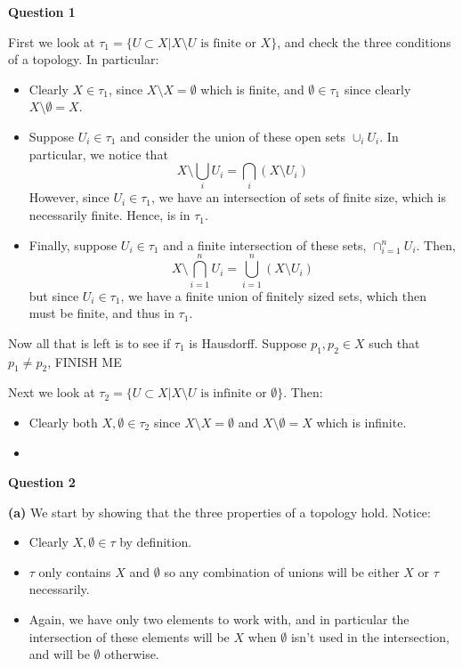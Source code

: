 \documentclass[10pt]{article}
\begin{document}
\textbf{Question 1}

First we look at $\tau_{1} = \{U\subset X | X \setminus U \text{ is finite or } X\}$, and check the three conditions of a topology. In particular:
\begin{itemize}
\item Clearly $X \in \tau_{1}$, since $X \setminus X = \emptyset$ which is finite, and $\emptyset \in \tau_{1}$ since clearly $X \setminus \emptyset = X$.
\item Suppose $U_{i}\in \tau_{1}$ and consider the union of these open sets $\cup_{i}U_{i}$. In particular, we notice that
  $$X \setminus \bigcup_{i}U_{i} = \bigcap_{i}\left(X\setminus U_{i}\right)$$
  However, since $U_{i}\in \tau_{1}$, we have an intersection of sets of finite size, which is necessarily finite. Hence, is in $\tau_{1}$.
\item Finally, suppose $U_{i}\in \tau_{1}$ and a finite intersection of these sets, $\cap_{i=1}^{n}U_{i}$. Then,
  $$X\setminus \bigcap_{i=1}^{n}U_{i} = \bigcup_{i=1}^{n}\left(X\setminus U_{i}\right)$$
  but since $U_{i}\in \tau_{1}$, we have a finite union of finitely sized sets, which then must be finite, and thus in $\tau_{1}$.
\end{itemize}
Now all that is left is to see if $\tau_{1}$ is Hausdorff. Suppose $p_{1},p_{2}\in X$ such that $p_{1} \neq p_{2}$, FINISH ME

Next we look at $\tau_{2} = \{ U \subset X | X\setminus U \text{ is infinite or } \emptyset \}$. Then:
\begin{itemize}
\item Clearly both $X,\emptyset \in \tau_{2}$ since $X\setminus X = \emptyset$ and $X \setminus \emptyset = X$ which is infinite.
\item  
\end{itemize}

\newpage

\textbf{Question 2}

\textbf{(a)} We start by showing that the three properties of a topology hold. Notice:
\begin{itemize}
\item Clearly $X,\emptyset \in \tau$ by definition.
\item $\tau$ only contains $X$ and $\emptyset$ so any combination of unions will be either $X$ or $\tau$ necessarily.
\item Again, we have only two elements to work with, and in particular the intersection of these elements will be $X$ when $\emptyset$ isn't used in the intersection, and will be $\emptyset$ otherwise.
\end{itemize}
\end{document}
